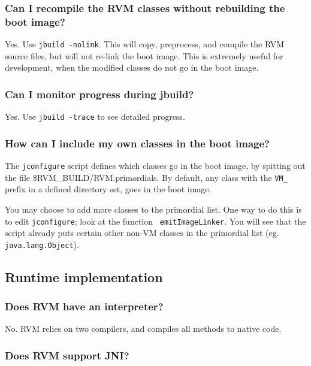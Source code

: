 \subsubsection{Can I recompile the RVM classes without rebuilding the boot
image?}

Yes.  Use {\tt jbuild -nolink}. This will copy, preprocess, and compile
the RVM source files, but will not re-link the boot image.  This is
extremely useful for development, when the modified classes do not go in
the boot image.

\subsubsection{Can I monitor progress during jbuild?}

Yes.  Use {\tt jbuild -trace} to see detailed progress. 

\subsubsection{How can I include my own classes in the boot image?}

The {\tt jconfigure} script defines which classes go in the boot image, by
spitting out the file {\$RVM\_BUILD/RVM.primordials}.  By default, any
class with the {\tt VM\_} prefix in a defined directory set, goes in the
boot image.

You may choose to add more classes to the primordial list.  One way to do
this is to edit {\tt jconfigure}; look at the function {\tt
emitImageLinker}.  You will see that the script already puts certain other
non-VM classes in the primordial list (eg. {\tt java.lang.Object}).

\AIXTMFooter

\subsection{Runtime implementation}

\subsubsection{Does RVM have an interpreter?}

No.  RVM relies on two compilers, and compiles all methods to native code.

\subsubsection{Does RVM support JNI?}

